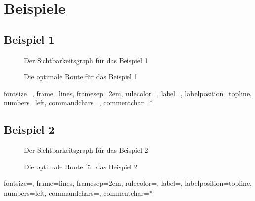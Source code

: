 \documentclass[a4paper, notitlepage, 12pt]{scrartcl}
\begin{document}
\section{Beispiele}
\subsection{Beispiel 1}
\begin{minipage}[b]{0.45\linewidth}
	\begin{figure}[H]
		
		\caption{Der Sichtbarkeitsgraph für das Beispiel 1}
	\end{figure}
\end{minipage}
\hspace{0.5cm}
\begin{minipage}[b]{0.45\linewidth}
	\begin{figure}[H] 
		\caption{Die optimale Route für das Beispiel 1}
	\end{figure}
\end{minipage}
{fontsize=\footnotesize,
	frame=lines,  %
	framesep=2em, %
	rulecolor=\color{Gray},
	label=,
	labelposition=topline,
	numbers=left,
	commandchars=\|\(\), %
	commentchar=*        %
}
\subsection{Beispiel 2}
\begin{minipage}[b]{0.45\linewidth}
	\begin{figure}[H]
		
		\caption{Der Sichtbarkeitsgraph für das Beispiel 2}
	\end{figure}
\end{minipage}
\hspace{0.5cm}
\begin{minipage}[b]{0.45\linewidth}
	\begin{figure}[H] 
		\caption{Die optimale Route für das Beispiel 2}
	\end{figure}
\end{minipage}
{fontsize=\footnotesize,
	frame=lines,  %
	framesep=2em, %
	rulecolor=\color{Gray},
	label=,
	labelposition=topline,
	numbers=left,
	commandchars=\|\(\), %
	commentchar=*        %
}
\end{document}
